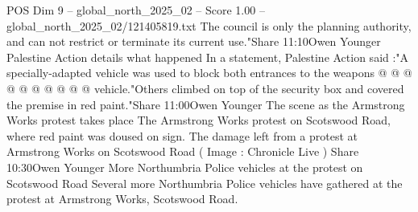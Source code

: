 \begin{textsample}{POS Dim 9 – global\_north\_2025\_02 – Score 1.00 – global\_north\_2025\_02/121405819.txt}
The council is only the planning authority, and can not restrict or terminate its current use."Share 11:10Owen Younger Palestine Action details what happened In a statement, Palestine Action said :"A specially-adapted vehicle was used to block both entrances to the weapons @ @ @ @ @ @ @ @ @ @ vehicle."Others climbed on top of the security box and covered the premise in red paint."Share 11:00Owen Younger The scene as the Armstrong Works protest takes place The Armstrong Works protest on Scotswood Road, where red paint was doused on sign.
The damage left from a protest at Armstrong Works on Scotswood Road ( Image : Chronicle Live ) Share 10:30Owen Younger More Northumbria Police vehicles at the protest on Scotswood Road Several more Northumbria Police vehicles have gathered at the protest at Armstrong Works, Scotswood Road.

\end{textsample}
